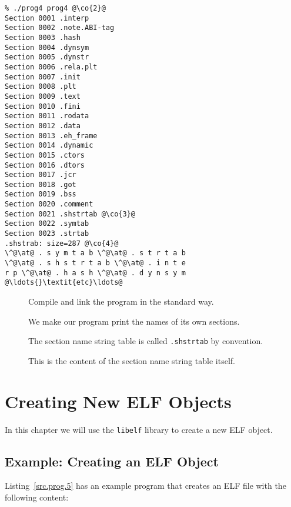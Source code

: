 \documentclass[a4paper,pdftex]{book}
\makeatletter
\newcommand{\code}[1]{\texttt{#1}}
\newcommand{\library}[1]{\texttt{#1}}
\newenvironment{callout}[2][black]{%
  \begingroup\newcommand{\@cocolor}{#1}%
  \setlength{\shadowsize}{1.2pt}%
  \newcommand{\@cogroup}[1]{#2}}{\endgroup}
\newcommand{\@co}[1]{\shadowbox{\color{\@cocolor}#1}}
\newcommand{\co}[1]{%
  \hypertarget{\@cogroup.#1.co}{%
    \hyperlink{\@cogroup.#1.cr}{\@co{#1}}}}
\newcommand{\coref}[1]{%
  \hypertarget{\@cogroup.#1.cr}{%
    \hyperlink{\@cogroup.#1.co}{\@co{#1}}}}
\makeatother
\begin{document}
\begin{callout}{scr4}
  \newcommand{\at}{@}
  \begin{lstlisting}[language={}, basicstyle=\small\ttfamily,
      label=scr.prog4, caption=Compiling and Running prog4]
% cc -o prog4 prog4.c -lelf @\co{1}@
% ./prog4 prog4 @\co{2}@
Section 0001 .interp
Section 0002 .note.ABI-tag
Section 0003 .hash
Section 0004 .dynsym
Section 0005 .dynstr
Section 0006 .rela.plt
Section 0007 .init
Section 0008 .plt
Section 0009 .text
Section 0010 .fini
Section 0011 .rodata
Section 0012 .data
Section 0013 .eh_frame
Section 0014 .dynamic
Section 0015 .ctors
Section 0016 .dtors
Section 0017 .jcr
Section 0018 .got
Section 0019 .bss
Section 0020 .comment
Section 0021 .shstrtab @\co{3}@
Section 0022 .symtab
Section 0023 .strtab
.shstrab: size=287 @\co{4}@
\^@\at@ . s y m t a b \^@\at@ . s t r t a b
\^@\at@ . s h s t r t a b \^@\at@ . i n t e
r p \^@\at@ . h a s h \^@\at@ . d y n s y m
@\ldots{}\textit{etc}\ldots@
  \end{lstlisting}

  \begin{description}
  \item[\coref{1}] Compile and link the program in the standard way.
  \item[\coref{2}] We make our program print the names of its own
    sections.
  \item[\coref{3}] The section name string table is called
    \code{.shstrtab} by convention.
  \item[\coref{4}] This is the content of the section name string table
    itself.
  \end{description}
\end{callout}

\chapter{Creating New ELF Objects}\label{chap.creating-elf}

In this chapter we will use the \library{libelf} library to create a
new ELF object.

\section{Example: Creating an ELF Object}

Listing~\vref{src.prog.5} has an example program that creates an ELF
file with the following content:
\end{document}
